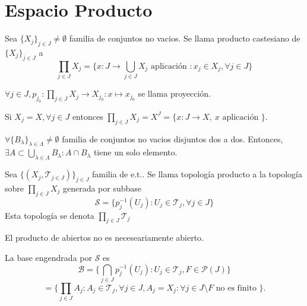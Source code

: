 \section{Espacio Producto}

\begin{defn}
  Sea $\{ X_{j} \}_{j \in J} \neq \emptyset$ familia de conjuntos no vacios. Se llama producto castesiano de $\{ X_{j} \}_{j \in J}$ a 
  \[ 
   \prod_{j \in J} X_{j} = \{ x : J \to \bigcup_{j \in J} X_{j} \text{ aplicación } : x_{j} \in X_{j}, \forall j \in J \}
  \] 
\end{defn} 

\begin{obs}
  $\forall j \in J, p_{j_{0}}: \prod_{j \in J} X_{j} \to X_{j_{0}} : x \mapsto x_{j_{0}}$ se llama proyección.
\end{obs}

\begin{obs}
  Si $X_{j} = X, \forall j \in J$ entonces $\prod_{j \in J} X_{j} = X^{J} = \{ x: J \to X, \ x \text{ aplicación } \}$.
\end{obs}

\begin{defn}
  $\forall \{ B_{\lambda} \}_{\lambda \in \Lambda} \neq \emptyset$ familia de conjuntos no vacios disjuntos dos a dos. Entonces, $ \exists A \subset \bigcup_{\lambda \in \Lambda} B_{\lambda}: A \cap B_{\lambda}$ tiene un solo elemento.
\end{defn}

\begin{defn}
  Sea $\{ ( X_{j}, \mathcal{T}_{j \in J} ) \}_{j \in J}$ familia de e.t.. Se llama topología producto a la topología sobre $\prod_{j \in J} X_{j}$ generada por subbase
  \[ 
    \mathcal{S} = \{ p_{j}^{-1}(U_{j}) : U_{j} \in \mathcal{T}_{j}, \forall j \in J \} 
  \] 
  Esta topología se denota $\prod_{j \in J} \mathcal{T}_{j}$
\end{defn}

\begin{obs}
  El producto de abiertos no es neceseariamente abierto.
\end{obs}

\begin{obs}
La base engendrada por $\mathcal{S}$ es 
\[ 
  \mathcal{B} = \big\{ \bigcap_{j \in J} p_{j}^{-1}(U_{j}) : U_{j} \in \mathcal{T}_{j}, F \in \mathcal{P}(J) \big\}
\]
\[ 
  = \big\{  \prod_{j \in J} A_{j} : A_{j} \in \mathcal{T}_{j}, \forall j \in J, A_{j} = X_{j} : \forall j \in J \setminus F \text{ no es finito } \big\}.
\] 
\end{obs}

